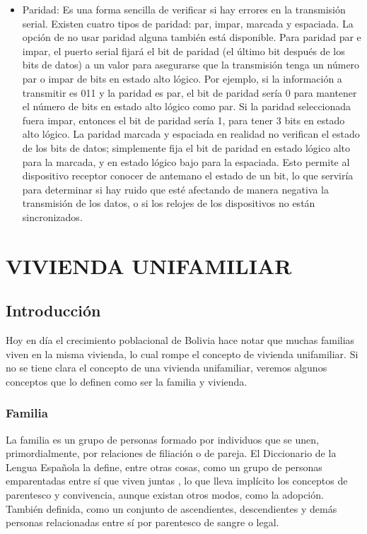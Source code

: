 \documentclass[11pt,letterpaper]{report}
\begin{document}
\begin{itemize}
		\item Paridad: Es una forma sencilla de verificar si hay errores en la transmisión serial. Existen cuatro tipos de paridad: par, impar, marcada y espaciada. La opción de no usar paridad alguna también está disponible. Para paridad par e impar, el puerto serial fijará el bit de paridad (el último bit después de los bits de datos) a un valor para asegurarse que la transmisión tenga un número par o impar de bits en estado alto lógico. Por ejemplo, si la información a transmitir es 011 y la paridad es par, el bit de paridad sería 0 para mantener el número de bits en estado alto lógico como par. Si la paridad seleccionada fuera impar, entonces el bit de paridad sería 1, para tener 3 bits en estado alto lógico. La paridad marcada y espaciada en realidad no verifican el estado de los bits de datos; simplemente fija el bit de paridad en estado lógico alto para la marcada, y en estado lógico bajo para la espaciada. Esto permite al dispositivo receptor conocer de antemano el estado de un bit, lo que serviría para determinar si hay ruido que esté afectando de manera negativa la transmisión de los datos, o si los relojes de los dispositivos no están sincronizados.
		\end{itemize}

\chapter{VIVIENDA UNIFAMILIAR}
	\section{Introducción}
	Hoy en día el crecimiento poblacional de Bolivia hace notar que muchas familias viven en la misma vivienda, lo cual rompe el concepto de vivienda unifamiliar. Si no se tiene clara el concepto de una vivienda unifamiliar, veremos algunos conceptos que lo definen como ser la familia y vivienda.
	\subsection{Familia}
	La familia es un grupo de personas formado por individuos que se unen, primordialmente, por relaciones de filiación o de pareja. El Diccionario de la Lengua Española la define, entre otras cosas, como un grupo de personas emparentadas entre sí que viven juntas , lo que lleva implícito los conceptos de parentesco y convivencia, aunque existan otros modos, como la adopción. También definida, como un conjunto de ascendientes, descendientes y demás personas relacionadas entre sí por parentesco de sangre o legal.
	
\end{document}
